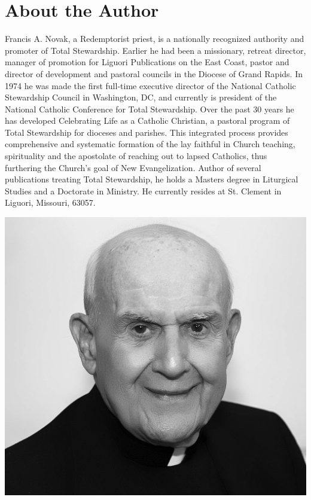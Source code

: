 \documentclass[oneside]{book}
\begin{document}

\chapter{About the Author}

Francis A. Novak, a Redemptorist priest, is a nationally recognized authority
and promoter of Total Stewardship. Earlier he had been a missionary, retreat
director, manager of promotion for Liguori Publications on the East Coast,
pastor and director of development and pastoral councils in the Diocese of Grand
Rapids. In 1974 he was made the first full-time executive director of the
National Catholic Stewardship Council in Washington, DC, and currently is
president of the National Catholic Conference for Total Stewardship. Over the
past 30 years he has developed Celebrating Life as a Catholic Christian, a
pastoral program of Total Stewardship for dioceses and parishes. This integrated
process provides comprehensive and systematic formation of the lay faithful in
Church teaching, spirituality and the apostolate of reaching out to lapsed
Catholics, thus furthering the Church's goal of New Evangelization. Author of
several publications treating Total Stewardship, he holds a Masters degree in
Liturgical Studies and a Doctorate in Ministry. He currently resides at
St. Clement in Liguori, Missouri, 63057.

\begin{center}

\includegraphics[scale=0.23]{fr-novak}

\end{center}

\end{document}
